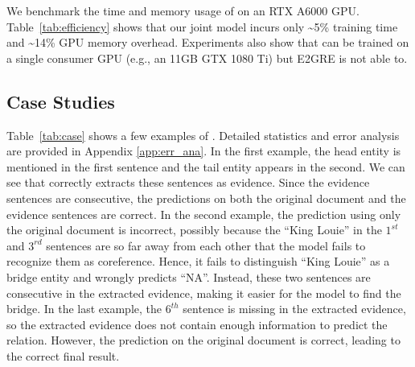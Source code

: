 \smallskip
{}
We benchmark the time and memory usage of \ours on an RTX A6000 GPU.
Table~\ref{tab:efficiency} shows that our joint model incurs only \textasciitilde5\% training time and \textasciitilde14\% GPU memory overhead.
Experiments also show that \ours can be trained on a single consumer GPU (e.g., an 11GB GTX 1080 Ti) but E2GRE is not able to.


\subsection{Case Studies}

Table~\ref{tab:case} shows a few examples of \ours. 
Detailed statistics and error analysis are provided in Appendix \ref{app:err_ana}.
In the first example, the head entity is mentioned in the first sentence and the tail entity appears in the second. 
We can see that \ours correctly extracts these sentences as evidence. 
Since the evidence sentences are consecutive, the predictions on both the original document and the evidence sentences are correct. 
In the second example, 
the prediction using only the original document is incorrect, possibly because the ``King Louie'' in the $1^{st}$ and $3^{rd}$ sentences are so far away from each other that the model fails to recognize them as coreference. Hence, it fails to distinguish ``King Louie'' as a bridge entity and wrongly predicts ``NA''.
Instead, these two sentences are consecutive in the extracted evidence, making it easier for the model to find the bridge. 
In the last example, the $6^{th}$ sentence is missing in the extracted evidence, 
so the extracted evidence does not contain enough information to predict the relation. However, the prediction on the original document is correct, leading to the correct final result.





